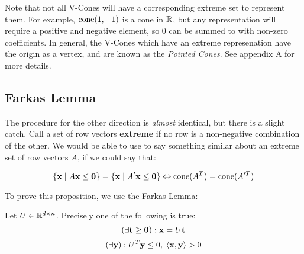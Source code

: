 \begin{Remark}\label{pointed_vcones}
  Note that not all V-Cones will have a corresponding extreme set to represent them.  For example, $\operatorname{cone}(1,-1)$ is a cone in $\mathbb{R}$, but any representation will require a positive and negative element, so $0$ can be summed to with non-zero coefficients.  In general, the V-Cones which have an extreme represenation have the origin as a vertex, and are known as the \textit{Pointed Cones}.  See appendix A for more details.
\end{Remark}

\subsection{Farkas Lemma}
The procedure for the other direction is \textit{almost} identical, but there is a slight catch.  Call a set of row vectors \textbf{extreme} if no row is a non-negative combination of the other.  We would be able to use  to say something similar about an extreme set of row vectors $A$, if we could say that:

\begin{Thm}\label{dual_cone}
	\[ \left\{\mathbf{x}\;|\; A\mathbf{x}\leq\mathbf{0}\right\} = \left\{\mathbf{x}\;|\; A'\mathbf{x}\leq\mathbf{0}\right\} \Leftrightarrow \operatorname{cone}(A^T) = \operatorname{cone}(A'^T) \]
\end{Thm}

To prove this proposition, we use the Farkas Lemma:

\begin{Prop}\label{farkas_lemma}
	Let $U \in \mathbb{R}^{d\times n}$.  Precisely one of the following is true:
	\[ (\exists \mathbf{t} \geq \mathbf{0}) : \mathbf{x} = U\mathbf{t} \]
	\[ (\exists \mathbf{y}) : U^T\mathbf{y} \leq 0,\; \left\langle \mathbf{x}, \mathbf{y} \right\rangle > 0 \]
\end{Prop}

